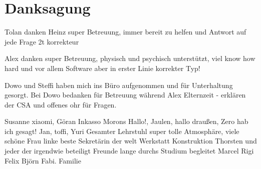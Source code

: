 \chapter{Danksagung}
Tolan danken
Heinz super Betreuung, immer bereit zu helfen und Antwort auf jede Frage
2t korrekteur

Alex danken super Betreuung, physisch und psychisch unterstützt, viel know how hard und vor allem Software aber in erster Linie korrekter Typ!

Dowo und Steffi haben mich ins Büro aufgenommen und für Unterhaltung gesorgt. Bei Dowo bedanken für Betreuung während Alex Elternzeit - erklären der CSA und offenes ohr für Fragen.

Susanne xiaomi, Göran Inkasso Morons 
Hallo!, Jaulen, hallo draußen, Zero hab ich gesagt!
Jan, toffi, Yuri
Gesamter Lehrstuhl super tolle Atmosphäre, viele schöne 
Frau linke beste Sekretärin der welt
Werkstatt Konstruktion Thorsten und jeder der irgendwie beteiligt
Freunde lange durchs Studium begleitet Marcel Rigi Felix Björn Fabi.
Familie
